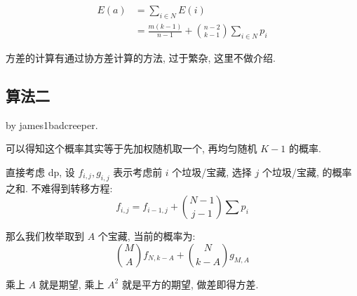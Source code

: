 \documentclass[a4paper, 12pt]{ctexart}
\begin{document}
\begin{align}
    E(a) &= \sum_{i \in N} E(i)\\
    &= \frac{m(k - 1)}{n - 1} + \binom{n - 2}{k - 1}\sum_{i \in N} p_i
\end{align}

方差的计算有通过协方差计算的方法, 过于繁杂, 这里不做介绍.

\subsection{算法二}

by james1badcreeper.

可以得知这个概率其实等于先加权随机取一个, 再均匀随机 $K - 1$ 的概率.

直接考虑 dp, 设 $f_{i,j}, g_{i, j}$ 表示考虑前 $i$ 个垃圾/宝藏, 选择 $j$ 个垃圾/宝藏, 的概率之和.
不难得到转移方程:
$$
f_{i, j} = f_{i - 1, j} + \binom{N - 1}{j - 1}\sum p_i
$$

那么我们枚举取到 $A$ 个宝藏, 当前的概率为:
$$
\binom{M}{A} f_{N, k - A} + \binom{N}{k - A} g_{M, A}
$$

乘上 $A$ 就是期望, 乘上 $A^2$ 就是平方的期望, 做差即得方差.
\end{document}
